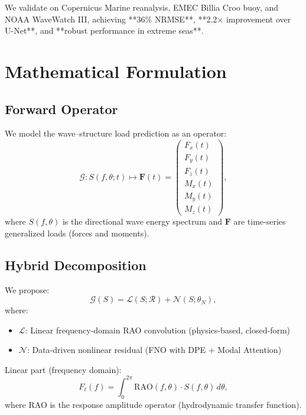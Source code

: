 \documentclass[journal,article,accept]{mdpi}
\newcommand{\cG}{\mathcal{G}}
\newcommand{\cL}{\mathcal{L}}
\newcommand{\cN}{\mathcal{N}}
\newcommand{\cR}{\mathcal{R}}
\begin{document}
We validate on Copernicus Marine reanalysis, EMEC Billia Croo buoy, and NOAA WaveWatch III, achieving **36\% NRMSE**, **2.2$\times$ improvement over U-Net**, and **robust performance in extreme seas**.

\section{Mathematical Formulation}
\label{sec:methods}

\subsection{Forward Operator}

We model the wave--structure load prediction as an operator:
\begin{equation}
\cG: S(f,\theta; t) \mapsto \mathbf{F}(t) = \begin{pmatrix} F_x(t) \\ F_y(t) \\ F_z(t) \\ M_x(t) \\ M_y(t) \\ M_z(t) \end{pmatrix},
\end{equation}
where $S(f,\theta)$ is the directional wave energy spectrum and $\mathbf{F}$ are time-series generalized loads (forces and moments).

\subsection{Hybrid Decomposition}

We propose:
\begin{equation}
\cG(S) = \cL(S;\cR) + \cN(S;\theta_N),
\end{equation}
where:
\begin{itemize}
\item $\cL$: Linear frequency-domain RAO convolution (physics-based, closed-form)
\item $\cN$: Data-driven nonlinear residual (FNO with DPE + Modal Attention)
\end{itemize}

Linear part (frequency domain):
\begin{equation}
F_\ell(f) = \int_0^{2\pi} \text{RAO}(f,\theta) \cdot S(f,\theta) \, d\theta,
\end{equation}
where RAO is the response amplitude operator (hydrodynamic transfer function).
\end{document}
